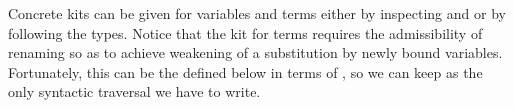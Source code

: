 \trav{}
\bindEnv{}

Concrete kits can be given for variables and terms either by inspecting
 and  or by following the types.
Notice that the kit for terms requires the admissibility of renaming so as to
achieve weakening of a substitution by newly bound variables.
Fortunately, this can be the  defined below in terms of
, so we can keep  as the only syntactic
traversal we have to write.

\begin{multicols}{2}
  \noindent\renKit{} \columnbreak

  \noindent\subKit{}
\end{multicols}
